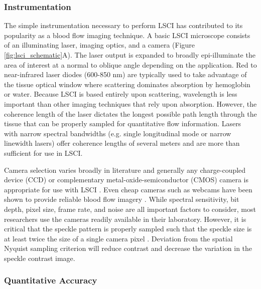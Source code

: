 \subsubsection{Instrumentation}

The simple instrumentation necessary to perform LSCI has contributed to its popularity as a blood flow imaging technique. A basic LSCI microscope consists of an illuminating laser, imaging optics, and a camera (Figure \ref{fig:lsci_schematic}A). The laser output is expanded to broadly epi-illuminate the area of interest at a normal to oblique angle depending on the application. Red to near-infrared laser diodes (600-850 nm) are typically used to take advantage of the tissue optical window where scattering dominates absorption by hemoglobin or water. Because LSCI is based entirely upon scattering, wavelength is less important than other imaging techniques that rely upon absorption. However, the coherence length of the laser dictates the longest possible path length through the tissue that can be properly sampled for quantitative flow information. Lasers with narrow spectral bandwidths (e.g. single longitudinal mode or narrow linewidth lasers) offer coherence lengths of several meters and are more than sufficient for use in LSCI.

Camera selection varies broadly in literature and generally any charge-coupled device (CCD) or complementary metal-oxide-semiconductor (CMOS) camera is appropriate for use with LSCI \cite{Draijer:2008ic, Boas:2010vr}. Even cheap cameras such as webcams have been shown to provide reliable blood flow imagery \cite{Richards:2013bi}. While spectral sensitivity, bit depth, pixel size, frame rate, and noise are all important factors to consider, most researchers use the cameras readily available in their laboratory. However, it is critical that the speckle pattern is properly sampled such that the speckle size is at least twice the size of a single camera pixel \cite{Kirkpatrick:2008ke}. Deviation from the spatial Nyquist sampling criterion will reduce contrast and decrease the variation in the speckle contrast image.

\subsubsection{Quantitative Accuracy}


